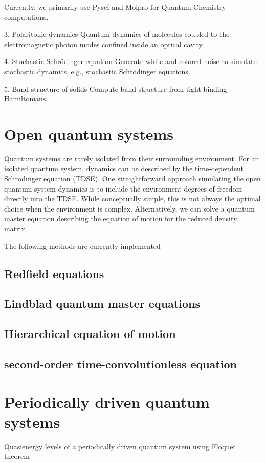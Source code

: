 \documentclass[a4paper,12pt]{book}
\begin{document}
Currently, we primarily use Pyscf and Molpro for Quantum Chemistry computations.

3. Polaritonic dynamics
Quantum dynamics of molecules coupled to the electromagnetic photon modes confined inside an optical cavity.

4. Stochastic Schrödinger equation
Generate white and colored noise to simulate stochastic dynamics, e.g., stochastic Schrödinger equations.

5. Band structure of solids
Compute band structure from tight-binding Hamiltonians.

\chapter{Open quantum systems} 
Quantum systems are rarely isolated from their surrounding environment. For an isolated quantum system, dynamics can be described by the time-dependent Schrödinger equation (TDSE). One straightforward approach simulating the open quantum system dynamics is to include the environment degrees of freedom directly into the TDSE. While conceptually simple, this is not always the optimal choice when the environment is complex. Alternatively, we can solve a quantum master equation describing the equation of motion for the reduced density matrix.

The following methods are currently implemented

\section{Redfield equations} 

\section{Lindblad quantum master equations} 
\section{Hierarchical equation of motion} 
\section{second-order time-convolutionless equation} 

\chapter{Periodically driven quantum systems} 
Quasienergy levels of a periodically driven quantum system using Floquet theorem
\end{document}
